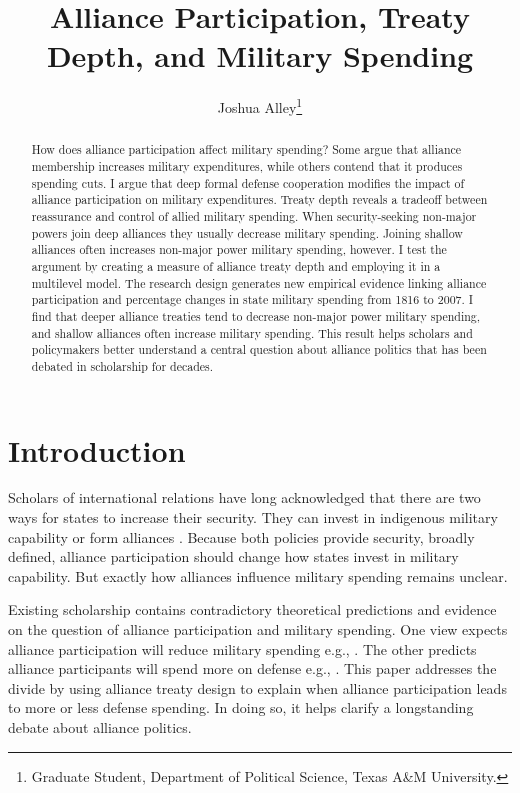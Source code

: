 \documentclass[12pt]{article}
\title{\textbf{Alliance Participation, Treaty Depth, and Military Spending}}
\author{Joshua Alley\footnote{Graduate Student,
Department of Political Science, Texas A\&M University.}}
\date{}
\begin{document}
\maketitle 

\doublespace 

\begin{abstract}
How does alliance participation affect military spending? 
Some argue that alliance membership increases military expenditures, while others contend that it produces spending cuts.
I argue that deep formal defense cooperation modifies the impact of alliance participation on military expenditures.  
Treaty depth reveals a tradeoff between reassurance and control of allied military spending. 
When security-seeking non-major powers join deep alliances they usually decrease military spending.
Joining shallow alliances often increases non-major power military spending, however.    
I test the argument by creating a measure of alliance treaty depth and employing it in a multilevel model. 
The research design generates new empirical evidence linking alliance participation and percentage changes in state military spending from 1816 to 2007. 
I find that deeper alliance treaties tend to decrease non-major power military spending, and shallow alliances often increase military spending.  
This result helps scholars and policymakers better understand a central question about alliance politics that has been debated in scholarship for decades. 
\end{abstract}


\newpage 


\section{Introduction}


Scholars of international relations have long acknowledged that there are two ways for states to increase their security. 
They can invest in indigenous military capability or form alliances \citep{Morgenthau1948, Altfield1984, Morrow1993}.
Because both policies provide security, broadly defined, alliance participation should change how states invest in military capability. 
But exactly how alliances influence military spending remains unclear. 


Existing scholarship contains contradictory theoretical predictions and evidence on the question of alliance participation and military spending. 
One view expects alliance participation will reduce military spending e.g., \citep{Morrow1993, Conybeare1994}. 
The other predicts alliance participants will spend more on defense e.g., \citep{Diehl1994, MorganPalmer2006}.
This paper addresses the divide by using alliance treaty design to explain when alliance participation leads to more or less defense spending. 
In doing so, it helps clarify a longstanding debate about alliance politics.
\end{document}
